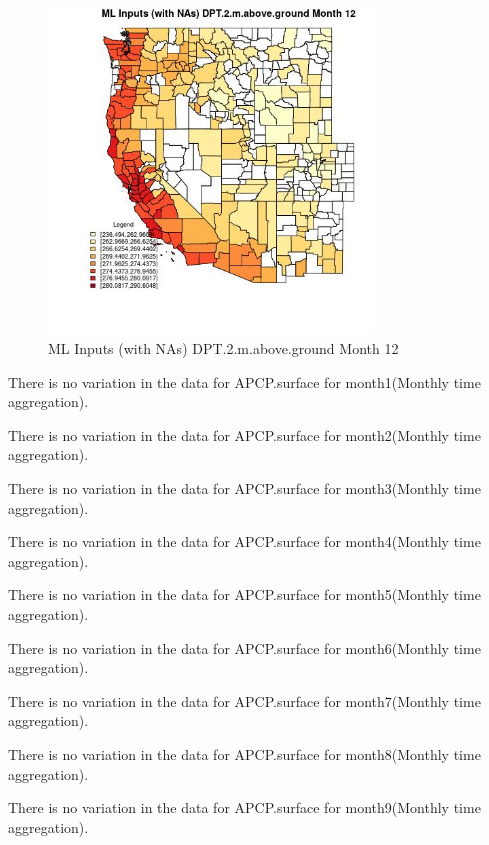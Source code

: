 \begin{figure} 
\centering  
\includegraphics[width=0.77\textwidth]{Code_Outputs/Report_ML_input_PM25_Step4_part_f_de_duplicated_aveswNAs_CountyDPT2mabovegroundmedianMonth12.jpg} 
\caption{\label{fig:Report_ML_input_PM25_Step4_part_f_de_duplicated_aveswNAsCountyDPT2mabovegroundmedianMonth12}ML Inputs (with NAs) DPT.2.m.above.ground Month 12} 
\end{figure} 
 

There is no variation in the data for APCP.surface for month1(Monthly time aggregation). 
 

There is no variation in the data for APCP.surface for month2(Monthly time aggregation). 
 

There is no variation in the data for APCP.surface for month3(Monthly time aggregation). 
 

There is no variation in the data for APCP.surface for month4(Monthly time aggregation). 
 

There is no variation in the data for APCP.surface for month5(Monthly time aggregation). 
 

There is no variation in the data for APCP.surface for month6(Monthly time aggregation). 
 

There is no variation in the data for APCP.surface for month7(Monthly time aggregation). 
 

There is no variation in the data for APCP.surface for month8(Monthly time aggregation). 
 

There is no variation in the data for APCP.surface for month9(Monthly time aggregation). 
 

